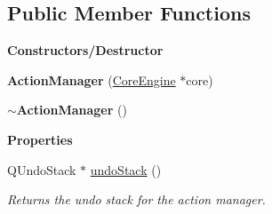 \subsection*{Public Member Functions}
\begin{Indent}\textbf{ Constructors/\+Destructor}\par
\begin{DoxyCompactItemize}
\item 
\mbox{\label{classrev_1_1_action_manager_aaae707ce7f626828ee5c00439cd55b72}} 
{\bfseries Action\+Manager} (\mbox{\hyperlink{classrev_1_1_core_engine}{Core\+Engine}} $\ast$core)
\item 
\mbox{\label{classrev_1_1_action_manager_a42098be3e7c3015a0c76088a39449cd2}} 
{\bfseries $\sim$\+Action\+Manager} ()
\end{DoxyCompactItemize}
\end{Indent}
\begin{Indent}\textbf{ Properties}\par
\begin{DoxyCompactItemize}
\item 
\mbox{\label{classrev_1_1_action_manager_aead613a664753a42f7206acd4c7df46e}} 
Q\+Undo\+Stack $\ast$ \mbox{\hyperlink{classrev_1_1_action_manager_aead613a664753a42f7206acd4c7df46e}{undo\+Stack}} ()
\begin{DoxyCompactList}\small\item\em Returns the undo stack for the action manager. \end{DoxyCompactList}\end{DoxyCompactItemize}
\end{Indent}
